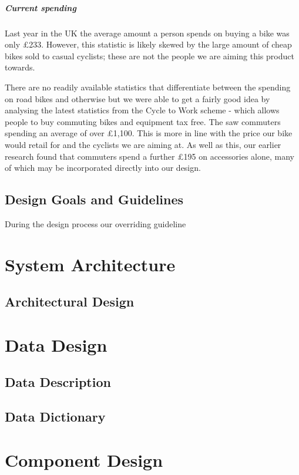 \documentclass[]{report}
\begin{document}
\paragraph{Current spending}
Last year in the UK the average amount a person spends on buying a bike was only £233. However, this statistic is likely skewed by the large amount of cheap bikes sold to casual cyclists; these are not the people we are aiming this product towards\cite{spending-more}. 

There are no readily available statistics that differentiate between the spending on road bikes and otherwise but we were able to get a fairly good idea by analysing the latest statistics from the Cycle to Work scheme - which allows people to buy commuting bikes and equipment tax free. The saw commuters spending an average of over £1,100\cite{spending-more}. This is more in line with the price our bike would retail for and the cyclists we are aiming at. As well as this, our earlier research found that commuters spend a further £195 on accessories alone, many of which may be incorporated directly into our design.
\section{Design Goals and Guidelines}
During the design process our overriding guideline

\chapter{System Architecture}
\section{Architectural Design}

\chapter{Data Design}
\section{Data Description}
\section{Data Dictionary}

\chapter{Component Design}
\end{document}
